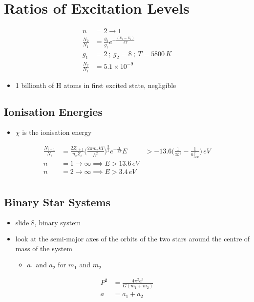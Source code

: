 \documentclass[a4paper,11pt,normalem]{article}
\begin{document}
\section{Ratios of Excitation Levels}
\begin{align*}
    n &= 2 \to 1 \\
    \frac{N_2}{N_1} &= \frac{g_2}{g_1} e^{-\frac{(E_2 - E_1)}{kT}} \\
    g_1 &= 2 ~;~ g_2 = 8 ~;~ T = 5800\,K \\
    \frac{N_2}{N_1} &= 5.1 \times 10^{-9}
\end{align*}
\begin{itemize}
    \item 1 billionth of H atoms in first excited state, negligible
\end{itemize}

\subsection{Ionisation Energies}
\begin{itemize}
    \item \(\chi\) is the ionisation energy
\end{itemize}
\begin{align*}
    \frac{N_{i + 1}}{N_i} &= \frac{2Z_{i + 1}}{n_e Z_i} \Big(\frac{2\pi m_e kT}{h^2}\Big)^{\frac{3}{2}}e^{-\frac{\chi}{kT}}
    E &> -13.6\Big(\frac{1}{\infty^2} - \frac{1}{n_{low}^2} \Big)\, eV \\
    n &= 1 \to \infty \implies E > 13.6\,eV \\
    n &= 2 \to \infty \implies E > 3.4\,eV
\end{align*}

\section{}
\subsection{Binary Star Systems}
\begin{itemize}
    \item slide 8, binary system
    \item look at the semi-major axes of the orbits of the two stars around the
  centre of mass of the system
        \begin{itemize}
            \item \(a_1\) and \(a_2\) for \(m_1\) and \(m_2\)
        \end{itemize}
\end{itemize}
\begin{align*}
    P^2 &= \frac{4\pi^2 a^3}{G(m_1 + m_2)} \\
    a &= a_1 + a_2
\end{align*}
\end{document}
